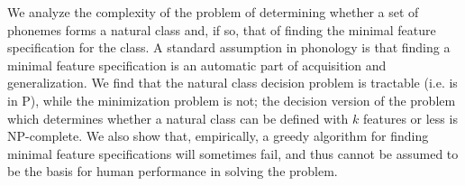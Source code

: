 We analyze the complexity of the problem of determining whether a set of phonemes forms a natural class and, if so, that of finding the minimal feature specification for the class. A standard assumption in phonology is that finding a minimal feature specification is an automatic part of acquisition and generalization.  We find that the natural class decision problem is tractable (i.e. is in P), while the  minimization problem is not; the decision version of the problem which determines whether a natural class can be defined with $k$ features or less is NP-complete. We also show that, empirically, a greedy algorithm for finding minimal feature specifications will sometimes fail, and thus cannot be assumed to be the basis for human performance in solving the problem.
